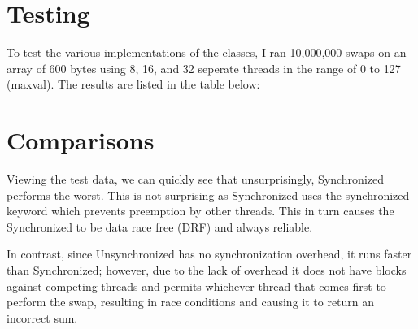 \section{Testing}

To test the various implementations of the classes, I ran 10,000,000 swaps on an array of 600 bytes
using 8, 16, and 32 seperate threads in the range of 0 to 127 (maxval). The results are listed in the
table below:

\begin{table}[!htbp]
\centering
{}
\end{table}

\section{Comparisons}

Viewing the test data, we can quickly see that unsurprisingly, Synchronized
performs the worst. This is not surprising as Synchronized
uses the synchronized keyword which prevents preemption by other threads. This in turn
causes the Synchronized to be data race free (DRF) and always reliable.

In contrast, since Unsynchronized has no synchronization overhead, it runs faster than Synchronized; however, due to the lack of
overhead it does not have blocks against competing threads and permits whichever thread that 
comes first to perform the swap, resulting in race conditions and causing it to return an incorrect
sum.

